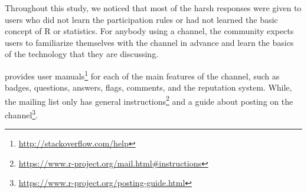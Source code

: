 


\subsubsection{\recb}

    Throughout this study, we noticed that most of the harsh responses were given to users who did not learn the participation rules or had not learned the basic concept of R or statistics.
    For anybody using a channel, the community expects users to familiarize themselves with the channel in advance and learn the basics of the technology that they are discussing.


    \SO provides user manuals\footnote{\url{http://stackoverflow.com/help}} for each of the main features of the channel, such as badges, questions,
    answers, flags, comments, and the reputation system. While, the \RH mailing list only has general instructions\footnote{\url{https://www.r-project.org/mail.html\#instructions}} and a guide about posting on the channel\footnote{\url{https://www.r-project.org/posting-guide.html}}.

